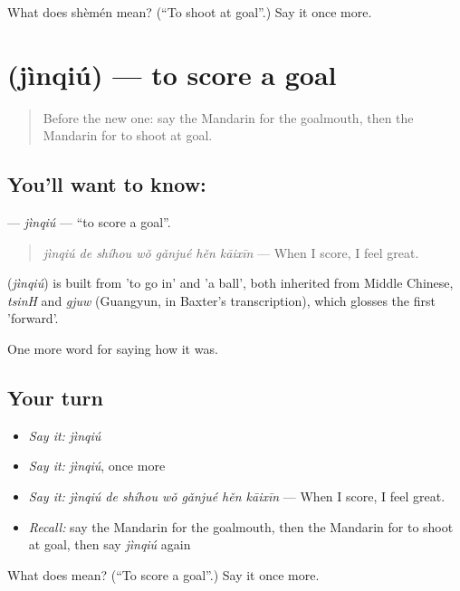 \begin{tcolorbox}[breakable,colback=teal!4,colframe=teal!35!black,title={Before you move on}]
What does shèmén mean? (\textquotedblleft{}To shoot at goal\textquotedblright{}.) Say it once more.
\end{tcolorbox}
\section[\texorpdfstring{\zh{进球} (jìnqiú)}{进球 (jìnqiú)}]{ (jìnqiú) — to score a goal}

\label{lesson:ZH-C498-jinqiu}



\begin{quote}
Before the new one: say the Mandarin for the goalmouth, then the Mandarin for to shoot at goal.
\end{quote}

\subsection*{You'll want to know: }
\textbf{} — \emph{jìnqiú} — \textquotedblleft{}to score a goal\textquotedblright{}.

\begin{quote}
\textbf{} \emph{jìnqiú de shíhou wǒ gǎnjué hěn kāixīn} — When I score, I feel great.
\end{quote}

\begin{cousinweb}
\textbf{} (\emph{jìnqiú}) is built from  'to go in' and  'a ball', both inherited from Middle Chinese, \emph{tsinH} and \emph{gjuw} (Guangyun, in Baxter's transcription), which glosses the first 'forward'.
\end{cousinweb}

\begin{grammarlens}[title={What you've built}]
One more word for saying how it was.
\end{grammarlens}

\subsection*{Your turn}
\begin{itemize}
\raggedright
  \item \emph{Say it:} \emph{jìnqiú}
  \item \emph{Say it:} \emph{jìnqiú}, once more
  \item \emph{Say it:} \emph{jìnqiú de shíhou wǒ gǎnjué hěn kāixīn} — When I score, I feel great.
  \item \emph{Recall:} say the Mandarin for the goalmouth, then the Mandarin for to shoot at goal, then say \emph{jìnqiú} again
\end{itemize}

\begin{tcolorbox}[breakable,colback=teal!4,colframe=teal!35!black,title={Before you move on}]
What does  mean? (\textquotedblleft{}To score a goal\textquotedblright{}.) Say it once more.
\end{tcolorbox}
